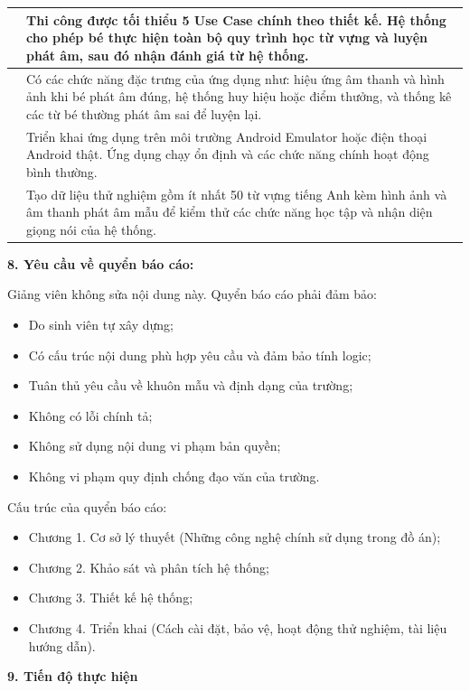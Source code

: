 \documentclass[../main.tex]{subfiles}
\begin{document}
\begin{center}
\begin{longtable}{|>{\centering\arraybackslash}p{1.2cm}|
				>{\raggedright\arraybackslash}p{13.2cm}|}
			3.3 & Thi công được tối thiểu 5 Use Case chính theo thiết kế. Hệ thống cho phép bé thực hiện toàn bộ quy trình học từ vựng và luyện phát âm, sau đó nhận đánh giá từ hệ thống.\\ \hline
			3.4 & Có các chức năng đặc trưng của ứng dụng như: hiệu ứng âm thanh và hình ảnh khi bé phát âm đúng, hệ thống huy hiệu hoặc điểm thưởng, và thống kê các từ bé thường phát âm sai để luyện lại.\\ \hline
			4.1 & Triển khai ứng dụng trên môi trường Android Emulator hoặc điện thoại Android thật. Ứng dụng chạy ổn định và các chức năng chính hoạt động bình thường.\\ \hline
			4.2 & Tạo dữ liệu thử nghiệm gồm ít nhất 50 từ vựng tiếng Anh kèm hình ảnh và âm thanh phát âm mẫu để kiểm thử các chức năng học tập và nhận diện giọng nói của hệ thống.\\ \hline
		\end{longtable}
		\normalsize
	\end{center}
	
	\fontsize{12pt}{17pt}\selectfont
	
	\textbf{8. Yêu cầu về quyển báo cáo:}
	
	Giảng viên không sửa nội dung này. Quyển báo cáo phải đảm bảo:
	\begin{itemize}
		\item Do sinh viên tự xây dựng;
		\item Có cấu trúc nội dung phù hợp yêu cầu và đảm bảo tính logic;
		\item Tuân thủ yêu cầu về khuôn mẫu và định dạng của trường;
		\item Không có lỗi chính tả;
		\item Không sử dụng nội dung vi phạm bản quyền;
		\item Không vi phạm quy định chống đạo văn của trường.
	\end{itemize}
	
	Cấu trúc của quyển báo cáo:
	\begin{itemize}
		\item Chương 1. Cơ sở lý thuyết (Những công nghệ chính sử dụng trong đồ án);
		\item Chương 2. Khảo sát và phân tích hệ thống;
		\item Chương 3. Thiết kế hệ thống;
		\item Chương 4. Triển khai (Cách cài đặt, bảo vệ, hoạt động thử nghiệm, tài liệu hướng dẫn).
	\end{itemize}
	
	\textbf{9. Tiến độ thực hiện}
	
\end{document}
